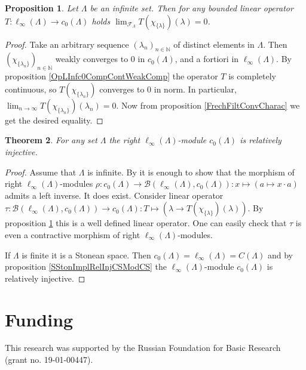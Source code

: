 \documentclass[12pt]{article}
\newtheorem{theorem}{Theorem}[section]
\newtheorem{proposition}[theorem]{Proposition}
\begin{document}
\begin{proposition}\label{OpLInfc0DiagConv0} Let $\Lambda$ be an infinite set. Then for any bounded linear operator $T:\ell_\infty(\Lambda)\to c_0(\Lambda)$ holds $\lim_{\mathcal{F}_{\Lambda}}T(\chi_{\{\lambda\}})(\lambda)=0$.
\end{proposition}
\begin{proof} Take an arbitrary sequence $(\lambda_n)_{n\in\mathbb{N}}$ of distinct elements in $\Lambda$. Then $(\chi_{\{\lambda_n\}})_{n\in\mathbb{N}}$ weakly converges to 0 in $c_0(\Lambda)$, and a fortiori in $\ell_\infty(\Lambda)$. By proposition \ref{OpLInfc0CompContWeakComp} the operator $T$ is completely continuous, so $T(\chi_{\{\lambda_n\}})$ converges to 0 in norm. In particular, $\lim_{n\to\infty} T(\chi_{\{\lambda_n\}})(\lambda_n)=0$. Now from proposition \ref{FrechFiltConvCharac} we get the desired equality.
\end{proof}

\begin{theorem}\label{RelInjLInfModc0} For any set $\Lambda$ the right $\ell_\infty(\Lambda)$-module $c_0(\Lambda)$ is relatively injective.
\end{theorem}
\begin{proof} Assume that $\Lambda$ is infinite. By \cite[proposition IV.1.39]{HelHomolBanTopAlg} it is enough to show that the morphism of right $\ell_\infty(\Lambda)$-modules $\rho:c_0(\Lambda)\to\mathcal{B}(\ell_\infty(\Lambda), c_0(\Lambda)):x\mapsto(a\mapsto x\cdot a)$ admits a left inverse. It does exist. Consider linear operator $\tau:\mathcal{B}(\ell_\infty(\Lambda), c_0(\Lambda))\to c_0(\Lambda): T\mapsto(\lambda\to T(\chi_{\{\lambda\}})(\lambda))$. By proposition \ref{OpLInfc0DiagConv0} this is a well defined linear operator. One can easily check that $\tau$ is even a contractive morphism of right $\ell_\infty(\Lambda)$-modules.

    If $\Lambda$ is finite it is a Stonean space. Then $c_0(\Lambda)=\ell_\infty(\Lambda)=C(\Lambda)$ and by proposition \ref{SStonImplRelInjCSModCS} the $\ell_\infty(\Lambda)$-module $c_0(\Lambda)$ is relatively injective.
\end{proof}


\section{Funding}
\label{SectionFunding}
This research was supported by the Russian Foundation for Basic Research (grant no. 19-01-00447).
\end{document}
